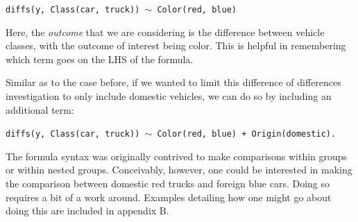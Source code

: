 \documentclass{article}
\begin{document}
\begin{center}
\tt diffs(y, Class(car, truck)) $\sim$ Color(red, blue)
\end{center}

Here, the \textit{outcome} that we are considering is the difference between vehicle classes, with the outcome of interest being color. This is helpful in remembering which term goes on the LHS of the formula. 

Similar as to the case before, if we wanted to limit this difference of differences investigation to only include domestic vehicles, we can do so by including an additional term:

\begin{center}
\tt diffs(y, Class(car, truck)) $\sim$ Color(red, blue) + Origin(domestic).
\end{center}

The formula syntax was originally contrived to make comparisons within groups or within nested groups. Conceivably, however, one could be interested in making the comparison between domestic red trucks and foreign blue cars. Doing so requires a bit of a work around. Examples detailing how one might go about doing this are included in appendix B. 
\end{document}
